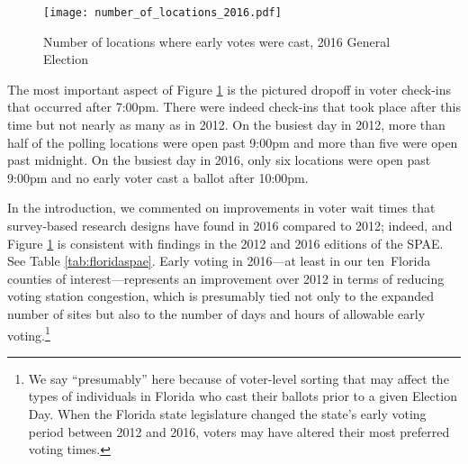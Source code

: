 \documentclass[12pt,titlepage]{article}
\newcommand{\numcounties}{ten}
\begin{document}
\begin{figure}[!ht]
  \caption{Number of locations where early votes were cast, 2016 General
    Election}
  \label{fig:nrlocs2016}
  \centering
    \centering\texttt{[image: number\_of\_locations\_2016.pdf]}
\end{figure}

The most important aspect of Figure \ref{fig:nrlocs2016} is the
pictured dropoff in voter check-ins that occurred after 7:00pm. There
were indeed check-ins that took place after this time but not nearly
as many as in 2012. On the busiest day in 2012, more than half of the
polling locations were open past 9:00pm and more than five were open
past midnight. On the busiest day in 2016, only six locations were
open past 9:00pm and no early voter cast a ballot after 10:00pm.

In the introduction, we commented on improvements in voter wait times
that survey-based research designs have found in 2016 compared to
2012; indeed, and Figure \ref{fig:nrlocs2016} is consistent with
findings in the 2012 \citep{spae2012} and 2016 \citep{spae2016}
editions of the SPAE.  See Table \ref{tab:floridaspae}.  Early voting
in 2016---at least in our \numcounties\ Florida counties of
interest---represents an improvement over 2012 in terms of reducing
voting station congestion, which is presumably tied not only to the
expanded number of sites but also to the number of days and hours of
allowable early voting.\footnote{We say ``presumably'' here because of
  voter-level sorting that may affect the types of individuals in
  Florida who cast their ballots prior to a given Election Day.  When
  the Florida state legislature changed the state's early voting
  period between 2012 and 2016, voters may have altered their most
  preferred voting times.}
\end{document}

